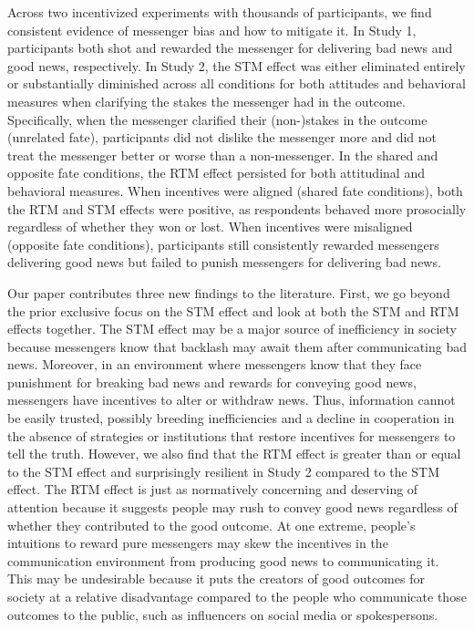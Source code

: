 Across two incentivized experiments with thousands of participants, we
find consistent evidence of messenger bias and how to mitigate it.
In Study 1, participants both shot and rewarded the messenger for
delivering bad news and good news, respectively. In Study 2, the
STM effect was either eliminated entirely or substantially diminished
across all conditions for both attitudes and behavioral measures when
clarifying the stakes the messenger had in the outcome. Specifically,
when the messenger clarified their (non-)stakes in the outcome
(unrelated fate), participants did not dislike the messenger more and
did not treat the messenger better or worse than a non-messenger. In the
shared and opposite fate conditions, the RTM effect persisted for both
attitudinal and behavioral measures. When incentives were aligned
(shared fate conditions), both the RTM and STM effects were positive, as
respondents behaved more prosocially regardless of whether they won or
lost. When incentives were misaligned (opposite fate conditions),
participants still consistently rewarded messengers delivering good
news but failed to punish messengers for delivering bad news.

Our paper contributes three new findings to the literature. First, we go
beyond the prior exclusive focus on the STM effect and look at both the
STM and RTM effects together. The STM effect may be a major source of
inefficiency in society because messengers know that backlash may await
them after communicating bad news. Moreover, in an environment where
messengers know that they face punishment for breaking bad news and
rewards for conveying good news, messengers have incentives to alter or
withdraw news. Thus, information cannot be easily trusted, possibly
breeding inefficiencies and a decline in cooperation in the absence of
strategies or institutions that restore incentives for messengers to
tell the truth. However, we also find that the RTM effect is greater
than or equal to the STM effect and surprisingly resilient in Study 2
compared to the STM effect. The RTM effect is just as normatively concerning
and deserving of attention because it suggests people may rush to convey
good news regardless of whether they contributed to the good outcome. At
one extreme, people's intuitions to reward pure messengers may skew the
incentives in the communication environment from producing good news to
communicating it. This may be undesirable because it puts the creators
of good outcomes for society at a relative disadvantage compared to the
people who communicate those outcomes to the public, such as influencers
on social media or spokespersons.

